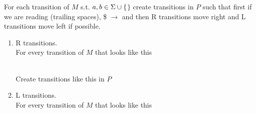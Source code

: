 \item [5.] For each transition of $M$ s.t. $a,b \in \Sigma \cup \{$\spc$\}$ create transitions in $P$ such that first if we are reading (trailing spaces), \$ $\rightarrow$  \spc \: and then R transitions move right and L transitions move left if possible.
\begin{enumerate}
    \item R transitions.\\
    For every transition of $M$ that looks like this\\
    \begin{figure}[h]
    \centering
    \end{figure}\\
    Create transitions like this in $P$\\
        \begin{figure}[h]
    \centering
    \end{figure}
    \item L transitions.\\
    For every transition of $M$ that looks like this\\
    \begin{figure}[h]
    \centering
\end{figure}
\end{enumerate}
